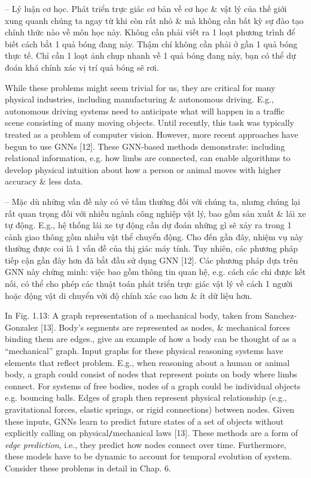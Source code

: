 \documentclass{article}
\begin{document}
\begin{itemize}
\begin{itemize}
\begin{itemize}
            -- {\sf Lý luận cơ học.} Phát triển trực giác cơ bản về cơ học \& vật lý của thế giới xung quanh chúng ta ngay từ khi còn rất nhỏ \& mà không cần bất kỳ sự đào tạo chính thức nào về môn học này. Không cần phải viết ra 1 loạt phương trình để biết cách bắt 1 quả bóng đang nảy. Thậm chí không cần phải ở gần 1 quả bóng thực tế. Chỉ cần 1 loạt ảnh chụp nhanh về 1 quả bóng đang nảy, bạn có thể dự đoán khá chính xác vị trí quả bóng sẽ rơi.

            While these problems might seem trivial for us, they are critical for many physical industries, including manufacturing \& autonomous driving. E.g., autonomous driving systems need to anticipate what will happen in a traffic scene consisting of many moving objects. Until recently, this task was typically treated as a problem of computer vision. However, more recent approaches have begun to use GNNs [12]. These GNN-based methods demonstrate: including relational information, e.g. how limbs are connected, can enable algorithms to develop physical intuition about how a person or animal moves with higher accuracy \& less data.

            -- Mặc dù những vấn đề này có vẻ tầm thường đối với chúng ta, nhưng chúng lại rất quan trọng đối với nhiều ngành công nghiệp vật lý, bao gồm sản xuất \& lái xe tự động. E.g., hệ thống lái xe tự động cần dự đoán những gì sẽ xảy ra trong 1 cảnh giao thông gồm nhiều vật thể chuyển động. Cho đến gần đây, nhiệm vụ này thường được coi là 1 vấn đề của thị giác máy tính. Tuy nhiên, các phương pháp tiếp cận gần đây hơn đã bắt đầu sử dụng GNN [12]. Các phương pháp dựa trên GNN này chứng minh: việc bao gồm thông tin quan hệ, e.g. cách các chi được kết nối, có thể cho phép các thuật toán phát triển trực giác vật lý về cách 1 người hoặc động vật di chuyển với độ chính xác cao hơn \& ít dữ liệu hơn.

            In {\sf Fig. 1.13: A graph representation of a mechanical body, taken from Sanchez-Gonzalez [13]. Body's segments are represented as nodes, \& mechanical forces binding them are edges.}, give an example of how a body can be thought of as a ``mechanical'' graph. Input graphs for these physical reasoning systems have elements that reflect problem. E.g., when reasoning about a human or animal body, a graph could consist of nodes that represent points on body where limbs connect. For systems of free bodies, nodes of a graph could be individual objects e.g. bouncing balls. Edges of graph then represent physical relationship (e.g., gravitational forces, elastic springs, or rigid connections) between nodes. Given these inputs, GNNs learn to predict future states of a set of objects without explicitly calling on physical{\tt/}mechanical laws [13]. These methods are a form of {\it edge prediction}, i.e., they predict how nodes connect over time. Furthermore, these models have to be dynamic to account for temporal evolution of system. Consider these problems in detail in Chap. 6.


\end{itemize}
\end{itemize}
\end{itemize}
\end{document}
